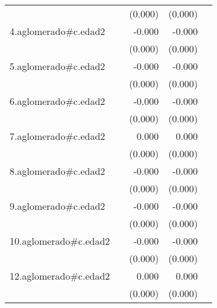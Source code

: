 {\begin{longtable}{l*{4}{D{.}{.}{-1}}}
            &                     &     (0.000)         &     (0.000)         &                     \\
\addlinespace
4.aglomerado#c.edad2&                     &      -0.000\sym{*}  &      -0.000\sym{***}&                     \\
            &                     &     (0.000)         &     (0.000)         &                     \\
\addlinespace
5.aglomerado#c.edad2&                     &      -0.000         &      -0.000\sym{*}  &                     \\
            &                     &     (0.000)         &     (0.000)         &                     \\
\addlinespace
6.aglomerado#c.edad2&                     &      -0.000         &      -0.000\sym{*}  &                     \\
            &                     &     (0.000)         &     (0.000)         &                     \\
\addlinespace
7.aglomerado#c.edad2&                     &       0.000         &       0.000         &                     \\
            &                     &     (0.000)         &     (0.000)         &                     \\
\addlinespace
8.aglomerado#c.edad2&                     &      -0.000         &      -0.000         &                     \\
            &                     &     (0.000)         &     (0.000)         &                     \\
\addlinespace
9.aglomerado#c.edad2&                     &      -0.000\sym{*}  &      -0.000\sym{***}&                     \\
            &                     &     (0.000)         &     (0.000)         &                     \\
\addlinespace
10.aglomerado#c.edad2&                     &      -0.000         &      -0.000         &                     \\
            &                     &     (0.000)         &     (0.000)         &                     \\
\addlinespace
12.aglomerado#c.edad2&                     &       0.000         &       0.000         &                     \\
            &                     &     (0.000)         &     (0.000)         &                     \\

\end{longtable}}
